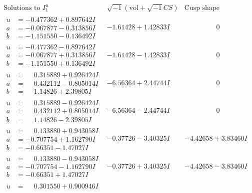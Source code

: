 \documentclass[1p]{elsarticle_modified}
\theoremstyle{definition}
\newcommand{\I}{\sqrt{-1}}
\begin{document}
$$\begin{array}{c|c|c}  
\text{Solutions to }I^u_{1}& \I (\text{vol} + \sqrt{-1}CS) & \text{Cusp shape}\\
 \hline 
\begin{aligned}
u &= -0.477362 + 0.897642 I \\
a &= -0.067877 - 0.313856 I \\
b &= -1.151550 - 0.136492 I\end{aligned}
 & -1.61428 + 1.42833 I & \phantom{-0.000000 } 0 \\ \hline\begin{aligned}
u &= -0.477362 - 0.897642 I \\
a &= -0.067877 + 0.313856 I \\
b &= -1.151550 + 0.136492 I\end{aligned}
 & -1.61428 - 1.42833 I & \phantom{-0.000000 } 0 \\ \hline\begin{aligned}
u &= \phantom{-}0.315889 + 0.926424 I \\
a &= \phantom{-}0.432112 - 0.805014 I \\
b &= \phantom{-}1.14826 + 2.39805 I\end{aligned}
 & -6.56364 + 2.44744 I & \phantom{-0.000000 } 0 \\ \hline\begin{aligned}
u &= \phantom{-}0.315889 - 0.926424 I \\
a &= \phantom{-}0.432112 + 0.805014 I \\
b &= \phantom{-}1.14826 - 2.39805 I\end{aligned}
 & -6.56364 - 2.44744 I & \phantom{-0.000000 } 0 \\ \hline\begin{aligned}
u &= \phantom{-}0.133880 + 0.943058 I \\
a &= -0.707754 + 1.162790 I \\
b &= -0.66351 - 1.47027 I\end{aligned}
 & -0.37726 - 3.40325 I & -4.42658 + 3.83460 I \\ \hline\begin{aligned}
u &= \phantom{-}0.133880 - 0.943058 I \\
a &= -0.707754 - 1.162790 I \\
b &= -0.66351 + 1.47027 I\end{aligned}
 & -0.37726 + 3.40325 I & -4.42658 - 3.83460 I \\ \hline\begin{aligned}
u &= \phantom{-}0.301550 + 0.900946 I \\

\end{aligned}
\end{array}$$
\end{document}
